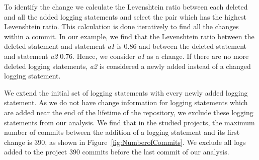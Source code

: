 






To identify the change we calculate the Levenshtein ratio between each deleted and all the added logging statements and select the pair which has the highest Levenshtein ratio. This calculation is done iteratively to find all the changes within a commit. In our example, we find that the Levenshtein ratio between the deleted statement and statement \emph{a1} is 0.86 and between the deleted statement and statement \emph{a2} 0.76. Hence, we consider \emph{a1} as a change. If there are no more deleted logging statements, \emph{a2} is considered a newly added instead of a changed logging statement. 

We extend the initial set of logging statements with every newly added logging statement. 
As we do not have change information for logging statements which are added near the end of the lifetime of the repository, we exclude these logging statements from our analysis. We find that in the studied projects, the maximum number of commits between the addition of a logging statement and its first change is 390, as shown in Figure~\ref{fig:NumberofCommits}. We exclude all logs added to the project 390 commits before the last commit of our analysis. 


